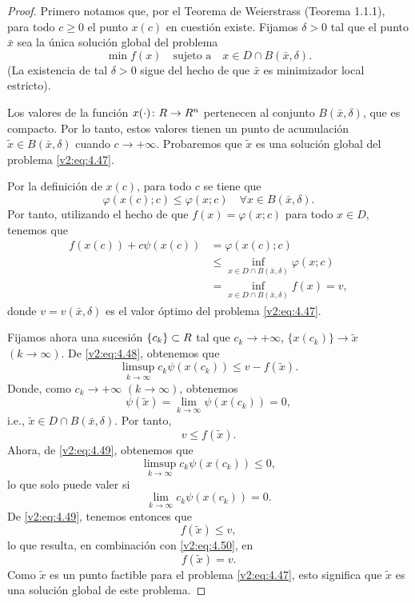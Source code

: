 \begin{proof}
    Primero notamos que, por el Teorema de Weierstrass (Teorema 1.1.1), para todo $c \ge 0$ el punto $x(c)$ en cuestión existe.
    Fijamos $\delta > 0$ tal que el punto $\bar{x}$ sea la única solución global del problema
    \begin{equation}
        \min f(x) \quad \text{sujeto a} \quad x \in D \cap B(\bar{x}, \delta).
        \label{v2:eq:4.47}
    \end{equation}
    (La existencia de tal $\delta > 0$ sigue del hecho de que $\bar{x}$ es minimizador local estricto).

    Los valores de la función $x(\cdot) \colon R \to R^n$ pertenecen al conjunto $B(\bar{x}, \delta)$, que es compacto. Por lo tanto, estos valores tienen un punto de acumulación $\tilde{x} \in B(\bar{x}, \delta)$ cuando $c \to +\infty$. Probaremos que $\tilde{x}$ es una solución global del problema \eqref{v2:eq:4.47}.

    Por la definición de $x(c)$, para todo $c$ se tiene que
    \[
        \varphi(x(c); c) \le \varphi(x; c) \quad \forall x \in B(\bar{x}, \delta).
    \]
    Por tanto, utilizando el hecho de que $f(x) = \varphi(x; c)$ para todo $x \in D$, tenemos que
    \begin{align}
        f(x(c)) + c\psi(x(c)) &= \varphi(x(c); c) \nonumber \\
        &\le \inf_{x \in D \cap B(\bar{x}, \delta)} \varphi(x; c) \nonumber \\
        &= \inf_{x \in D \cap B(\bar{x}, \delta)} f(x) = v,
        \label{v2:eq:4.48}
    \end{align}
    donde $v = v(\bar{x}, \delta)$ es el valor óptimo del problema \eqref{v2:eq:4.47}.

    Fijamos ahora una sucesión $\{c_k\} \subset R$ tal que $c_k \to +\infty$, $\{x(c_k)\} \to \tilde{x}$ $(k \to \infty)$. De \eqref{v2:eq:4.48}, obtenemos que
    \begin{equation}
        \limsup_{k \to \infty} c_k\psi(x(c_k)) \le v - f(\tilde{x}).
        \label{v2:eq:4.49}
    \end{equation}
    Donde, como $c_k \to +\infty$ $(k \to \infty)$, obtenemos
    \[
        \psi(\tilde{x}) = \lim_{k \to \infty} \psi(x(c_k)) = 0,
    \]
    i.e., $\tilde{x} \in D \cap B(\bar{x}, \delta)$. Por tanto,
    \begin{equation}
        v \le f(\tilde{x}).
        \label{v2:eq:4.50}
    \end{equation}
    Ahora, de \eqref{v2:eq:4.49}, obtenemos que
    \[
        \limsup_{k \to \infty} c_k\psi(x(c_k)) \le 0,
    \]
    lo que solo puede valer si
    \[
        \lim_{k \to \infty} c_k\psi(x(c_k)) = 0.
    \]
    De \eqref{v2:eq:4.49}, tenemos entonces que
    \[
        f(\tilde{x}) \le v,
    \]
    lo que resulta, en combinación con \eqref{v2:eq:4.50}, en
    \[
        f(\tilde{x}) = v.
    \]
    Como $\tilde{x}$ es un punto factible para el problema \eqref{v2:eq:4.47}, esto significa que $\tilde{x}$ es una solución global de este problema.


\end{proof}
